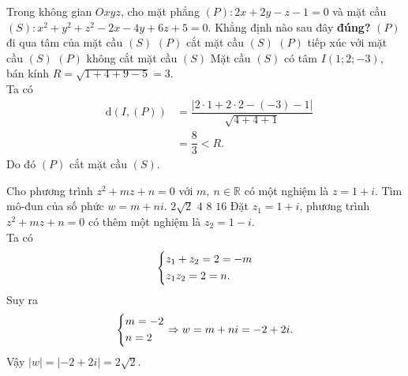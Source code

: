 \begin{ex}%
	Trong không gian $Oxyz$, cho mặt phẳng $(P)\colon2x+2y-z-1=0$ và mặt cầu $(S)\colon x^2+y^2+z^2-2x-4y+6z+5=0$. Khẳng định nào sau đây \textbf{đúng?}
	\choice
	{$(P)$ đi qua tâm của mặt cầu $(S)$}
	{\True $(P)$ cắt mặt cầu $(S)$}
	{$(P)$ tiếp xúc với mặt cầu $(S)$}
	{$(P)$ không cắt mặt cầu $(S)$}
	\loigiai
	{
		Mặt cầu $(S)$ có tâm $I(1;2;-3)$, bán kính $R=\sqrt{1+4+9-5}=3.$\\
		Ta có 
		\begin{eqnarray*}
			&\mathrm{d}(I,(P))&=\dfrac{|2\cdot1+2\cdot2-(-3)-1|}{\sqrt{4+4+1}} \\
			& &=\dfrac{8}{3}<R.
		\end{eqnarray*}
	    Do đó $(P)$ cắt mặt cầu $(S)$.
	}
\end{ex}

\begin{ex}%
	Cho phương trình $z^2+mz+n=0$ với $m,~n\in\mathbb{R}$ có một nghiệm là $z=1+i$. Tìm mô-đun của số phức $w=m+ni$.
	\choice
	{\True $2\sqrt{2}$}
	{$4$}
	{$8$}
	{$16$}
	\loigiai
	{
		Đặt $z_1=1+i$, phương trình $z^2+mz+n=0$ có thêm một nghiệm là $z_2=1-i$.\\
		Ta có 
		\[\left\{\begin{aligned}&z_1+z_2=2=-m\\&z_1z_2=2=n.\end{aligned}\right.\]
		Suy ra 
		\[\left\{\begin{aligned}&m=-2\\&n=2\end{aligned}\right. \Rightarrow w=m+ni=-2+2i.\]
		Vậy $|w|=|-2+2i|=2\sqrt{2}$.
	}
\end{ex}


